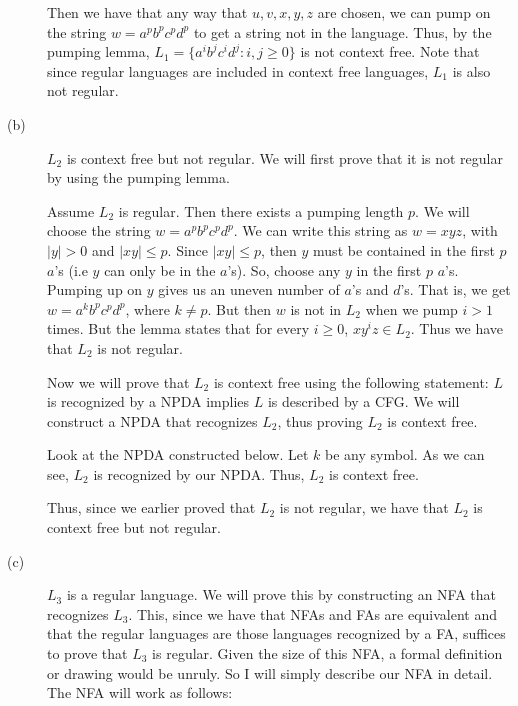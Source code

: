 \documentclass{article}
\begin{document}
\begin{description}
    Then we have that any way that $u,v,x,y,z$ are chosen, we can pump on the
    string $w = a^{p}b^{p}c^{p}d^{p}$ to get a string not in the language. Thus,
    by the pumping lemma, $L_{1} = \{a^{i}b^{j}c^{i}d^{j} : i, j \ge 0 \}$ is
    not context free. Note that since regular languages are included in
    context free languages, $L_{1}$ is also not regular.

    \item[(b)] $L_{2}$ is context free but not regular. We will first prove that
    it is not regular by using the pumping lemma.

    Assume $L_{2}$ is regular. Then there exists a pumping length $p$. We will
    choose the string $w = a^{p}b^{p}c^{p}d^{p}$. We can write this string
    as $w = xyz$, with $|y| > 0$ and $|xy| \leq p$. Since $|xy| \leq p$, then
    $y$ must be contained in the first $p$ $a$'s (i.e $y$ can only be in
    the $a$'s). So, choose any $y$ in the first $p$ $a$'s. Pumping up on $y$
    gives us an uneven number of $a$'s and $d$'s. That is, we get
    $w = a^{k}b^{p}c^{p}d^{p}$, where $k \neq p$. But then $w$ is not in $L_{2}$
    when we pump $i > 1$ times. But the lemma states that for every $i \ge 0$,
    $xy^{i}z \in L_{2}$. Thus we have that $L_{2}$ is not regular.

    Now we will prove that $L_{2}$ is context free using the following
    statement: $L$ is recognized by a NPDA implies $L$ is described by a CFG. We
    will construct a NPDA that recognizes $L_{2}$, thus proving $L_{2}$
    is context free.

    Look at the NPDA constructed below. Let $k$ be any symbol.
    As we can see, $L_{2}$ is recognized by our NPDA. Thus, $L_{2}$ is
    context free.

    \vspace{70mm}

    Thus, since we earlier proved that $L_{2}$ is not regular, we have that
    $L_{2}$ is context free but not regular.

    \item[(c)] $L_{3}$ is a regular language. We will prove this by constructing
        an NFA that recognizes $L_{3}$. This, since we have that NFAs and FAs
        are equivalent and that the regular languages are those languages
        recognized by a FA, suffices to prove that $L_{3}$ is regular. Given
        the size of this NFA, a formal definition or drawing would be unruly.
        So I will
        simply describe our NFA in detail. The NFA will work as follows:


\end{description}
\end{document}
